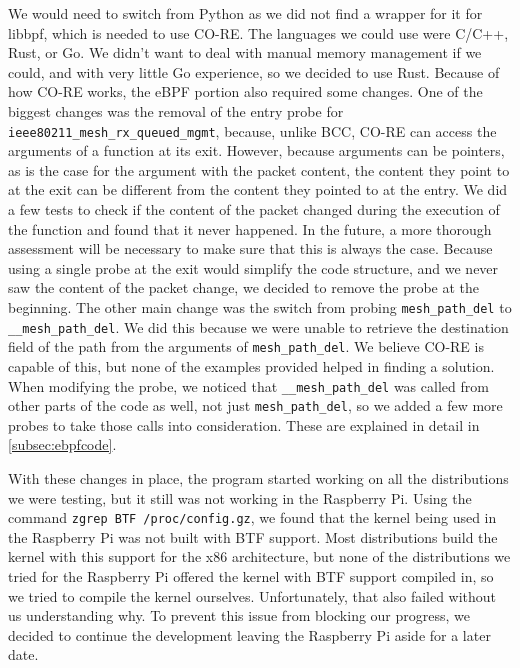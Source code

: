 We would need to switch from Python as we did not find a wrapper for it for
libbpf, which is needed to use \ac{CO-RE}. The languages we could use were
C/C++, Rust, or Go. We didn't want to deal with manual memory management if we
could, and with very little Go experience, so we decided to use Rust. Because of
how \ac{CO-RE} works, the eBPF portion also required some changes. One of the
biggest changes was the removal of the entry probe for
\texttt{ieee80211\_mesh\_rx\_queued\_mgmt}, because, unlike \ac{BCC}, \ac{CO-RE}
can access the arguments of a function at its exit. However, because arguments
can be pointers, as is the case for the argument with the packet content, the
content they point to at the exit can be different from the content they pointed
to at the entry. We did a few tests to check if the content of the packet
changed during the execution of the function and found that it never happened.
In the future, a more thorough assessment will be necessary to make sure that
this is always the case. Because using a single probe at the exit would simplify
the code structure, and we never saw the content of the packet change, we
decided to remove the probe at the beginning. The other main change was the
switch from probing \texttt{mesh\_path\_del} to \texttt{\_\_mesh\_path\_del}. We
did this because we were unable to retrieve the destination field of the path
from the arguments of \texttt{mesh\_path\_del}. We believe \ac{CO-RE} is capable
of this, but none of the examples provided helped in finding a solution. When
modifying the probe, we noticed that \texttt{\_\_mesh\_path\_del} was called
from other parts of the code as well, not just \texttt{mesh\_path\_del}, so we
added a few more probes to take those calls into consideration. These are
explained in detail in \autoref{subsec:ebpfcode}.

With these changes in place, the program started working on all the
distributions we were testing, but it still was not working in the Raspberry Pi.
Using the command \texttt{zgrep BTF /proc/config.gz}, we found that the kernel
being used in the Raspberry Pi was not built with \ac{BTF} support. Most
distributions build the kernel with this support for the x86 architecture, but
none of the distributions we tried for the Raspberry Pi offered the kernel with
\ac{BTF} support compiled in, so we tried to compile the kernel ourselves.
Unfortunately, that also failed without us understanding why. To prevent this
issue from blocking our progress, we decided to continue the development leaving
the Raspberry Pi aside for a later date.


